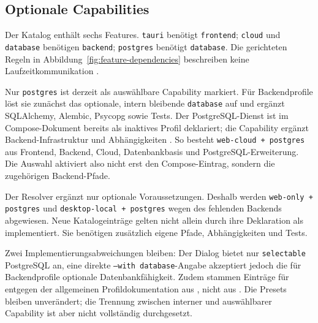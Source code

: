 \subsection{Optionale Capabilities}
\label{subsec:optionale-capabilities}

Der Katalog enthält sechs Features. \texttt{tauri} benötigt
\texttt{frontend}; \texttt{cloud} und \texttt{database} benötigen
\texttt{backend}; \texttt{postgres} benötigt \texttt{database}. Die
gerichteten Regeln in Abbildung~\ref{fig:feature-dependencies} beschreiben
keine Laufzeitkommunikation
\parencite{kleiveist2026profiles,kleiveist2026database}.



Nur \texttt{postgres} ist derzeit als auswählbare Capability markiert. Für
Backendprofile löst sie zunächst das optionale, intern bleibende
\texttt{database} auf und ergänzt SQLAlchemy, Alembic, Psycopg sowie Tests. Der
PostgreSQL-Dienst ist im Compose-Dokument bereits als inaktives Profil
deklariert; die Capability ergänzt Backend-Infrastruktur und Abhängigkeiten
\parencite{kleiveist2026deployment,kleiveist2026governance-snapshot}.
So besteht \texttt{web-cloud + postgres} aus Frontend, Backend, Cloud,
Datenbankbasis und PostgreSQL-Erweiterung. Die Auswahl aktiviert also nicht
erst den Compose-Eintrag, sondern die zugehörigen Backend-Pfade.

Der Resolver ergänzt nur optionale Voraussetzungen. Deshalb werden
\texttt{web-only + postgres} und \texttt{desktop-local + postgres} wegen des
fehlenden Backends abgewiesen. Neue Katalogeinträge gelten nicht allein durch
ihre Deklaration als implementiert.
Sie benötigen zusätzlich eigene Pfade, Abhängigkeiten und Tests.

Zwei Implementierungsabweichungen bleiben: Der Dialog bietet nur
\texttt{selectable} PostgreSQL an, eine direkte \texttt{--with database}-Angabe
akzeptiert jedoch die für Backendprofile optionale Datenbankfähigkeit. Zudem
stammen Einträge für  entgegen der allgemeinen
Profildokumentation aus , nicht aus
. Die Presets bleiben unverändert; die Trennung zwischen
interner und auswählbarer Capability ist aber nicht vollständig durchgesetzt.
